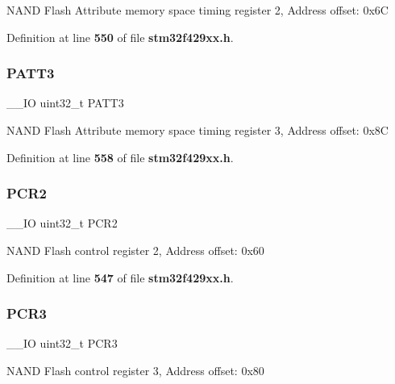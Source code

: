 N\+A\+ND Flash Attribute memory space timing register 2, Address offset\+: 0x6C 

Definition at line \textbf{ 550} of file \textbf{ stm32f429xx.\+h}.

\mbox{\label{structFMC__Bank2__3__TypeDef_aba03fea9c1bb2242d963e29f1b94d25e}} 
\subsubsection{P\+A\+T\+T3}
{\footnotesize\ttfamily \+\_\+\+\_\+\+IO uint32\+\_\+t P\+A\+T\+T3}

N\+A\+ND Flash Attribute memory space timing register 3, Address offset\+: 0x8C 

Definition at line \textbf{ 558} of file \textbf{ stm32f429xx.\+h}.

\mbox{\label{structFMC__Bank2__3__TypeDef_ab0cb1d704ee64c62ad5be55522a2683a}} 
\subsubsection{P\+C\+R2}
{\footnotesize\ttfamily \+\_\+\+\_\+\+IO uint32\+\_\+t P\+C\+R2}

N\+A\+ND Flash control register 2, Address offset\+: 0x60 

Definition at line \textbf{ 547} of file \textbf{ stm32f429xx.\+h}.

\mbox{\label{structFMC__Bank2__3__TypeDef_a73861fa74b83973fa1b5f92735c042ef}} 
\subsubsection{P\+C\+R3}
{\footnotesize\ttfamily \+\_\+\+\_\+\+IO uint32\+\_\+t P\+C\+R3}

N\+A\+ND Flash control register 3, Address offset\+: 0x80 

